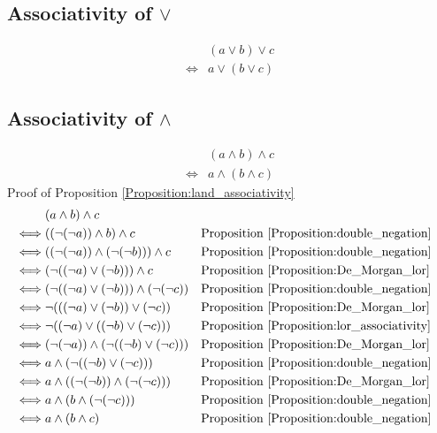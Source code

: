 \subsection{Associativity of $\lor$}
\begin{prop}
\label{Proposition:lor_associativity}
\begin{align*}
& (a \lor b) \lor c \\
\iff & a \lor (b \lor c)
\end{align*}
\end{prop}

\subsection{Associativity of $\land$}
\begin{prop}
\label{Proposition:land_associativity}
\begin{align*}
& (a \land b) \land c \\
\iff & a \land (b \land c)
\end{align*}
Proof of Proposition \ref{Proposition:land_associativity}
\begin{align*}
& (a \land b) \land c \\
\iff & ((\lnot (\lnot a)) \land b) \land c
& & \text{Proposition \ref{Proposition:double_negation}} \\
\iff & ((\lnot (\lnot a)) \land (\lnot (\lnot b))) \land c
& & \text{Proposition \ref{Proposition:double_negation}} \\
\iff & (\lnot ((\lnot a) \lor (\lnot b))) \land c
& & \text{Proposition \ref{Proposition:De_Morgan_lor}} \\
\iff & (\lnot ((\lnot a) \lor (\lnot b))) \land (\lnot (\lnot c))
& & \text{Proposition \ref{Proposition:double_negation}} \\
\iff & \lnot (((\lnot a) \lor (\lnot b)) \lor (\lnot c))
& & \text{Proposition \ref{Proposition:De_Morgan_lor}} \\
\iff & \lnot ((\lnot a) \lor ((\lnot b) \lor (\lnot c)))
& & \text{Proposition \ref{Proposition:lor_associativity}} \\
\iff & (\lnot (\lnot a)) \land (\lnot ((\lnot b) \lor (\lnot c)))
& & \text{Proposition \ref{Proposition:De_Morgan_lor}} \\
\iff & a \land (\lnot ((\lnot b) \lor (\lnot c)))
& & \text{Proposition \ref{Proposition:double_negation}} \\
\iff & a \land ((\lnot (\lnot b)) \land (\lnot (\lnot c)))
& & \text{Proposition \ref{Proposition:De_Morgan_lor}} \\
\iff & a \land (b \land (\lnot (\lnot c)))
& & \text{Proposition \ref{Proposition:double_negation}} \\
\iff & a \land (b \land c)
& & \text{Proposition \ref{Proposition:double_negation}} \\
\end{align*}
\end{prop}

